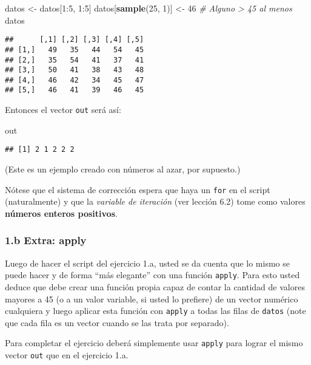 \documentclass[]{article}
\newenvironment{Shaded}{}{}
\newcommand{\KeywordTok}[1]{\textcolor[rgb]{0.00,0.44,0.13}{\textbf{{#1}}}}
\newcommand{\DecValTok}[1]{\textcolor[rgb]{0.25,0.63,0.44}{{#1}}}
\newcommand{\CommentTok}[1]{\textcolor[rgb]{0.38,0.63,0.69}{\textit{{#1}}}}
\newcommand{\NormalTok}[1]{{#1}}
\begin{document}
\begin{Shaded}
\begin{Highlighting}[]
\NormalTok{datos <- datos[}\DecValTok{1}\NormalTok{:}\DecValTok{5}\NormalTok{, }\DecValTok{1}\NormalTok{:}\DecValTok{5}\NormalTok{]}
\NormalTok{datos[}\KeywordTok{sample}\NormalTok{(}\DecValTok{25}\NormalTok{, }\DecValTok{1}\NormalTok{)] <- }\DecValTok{46}  \CommentTok{# Alguno > 45 al menos}
\NormalTok{datos}
\end{Highlighting}
\end{Shaded}
\begin{verbatim}
##      [,1] [,2] [,3] [,4] [,5]
## [1,]   49   35   44   54   45
## [2,]   35   54   41   37   41
## [3,]   50   41   38   43   48
## [4,]   46   42   34   45   47
## [5,]   46   41   39   46   45
\end{verbatim}
Entonces el vector \texttt{out} será así:

\begin{Shaded}
\begin{Highlighting}[]
\NormalTok{out}
\end{Highlighting}
\end{Shaded}
\begin{verbatim}
## [1] 2 1 2 2 2
\end{verbatim}
(Este es un ejemplo creado con números al azar, por supuesto.)

Nótese que el sistema de corrección espera que haya un \texttt{for} en
el script (naturalmente) y que la \emph{variable de iteración} (ver
lección 6.2) tome como valores \textbf{números enteros positivos}.

\subsubsection{1.b Extra: apply}

Luego de hacer el script del ejercicio 1.a, usted se da cuenta que lo
mismo se puede hacer y de forma ``más elegante'' con una función
\texttt{apply}. Para esto usted deduce que debe crear una función propia
capaz de contar la cantidad de valores mayores a 45 (o a un valor
variable, si usted lo prefiere) de un vector numérico cualquiera y luego
aplicar esta función con \texttt{apply} a todas las filas de
\texttt{datos} (note que cada fila es un vector cuando se las trata por
separado).

Para completar el ejercicio deberá simplemente usar \texttt{apply} para
lograr el mismo vector \texttt{out} que en el ejercicio 1.a.
\end{document}
